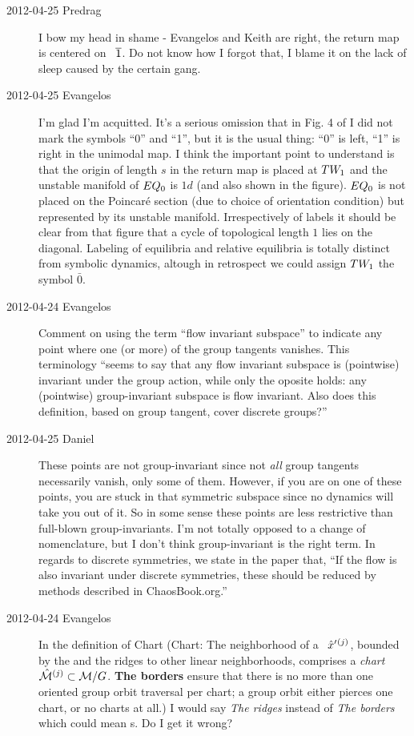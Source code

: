 \begin{description}
\item[2012-04-25 Predrag] I bow my head in shame - Evangelos and Keith
are right, the return map is centered on \rpo\ $\overline{1}$. Do not know
how I forgot that, I blame it on the lack of  sleep caused by the certain
gang.

\item[2012-04-25 Evangelos] I'm glad I'm acquitted. It's a serious omission that in Fig. 4
of  I did not mark the symbols ``0'' and ``1'', but it is the
usual thing: ``0'' is left, ``1'' is right in the unimodal map.
I think the important point to
understand is that the origin of length $s$ in the return map is placed at $TW_{1}$
and the unstable manifold of $EQ_{0}$ is $1d$ (and also shown in the figure).
$EQ_{0}$ is not placed on the Poincar\'e section (due to choice of orientation
condition) but represented by its unstable manifold.
Irrespectively of labels it should be clear from that figure that a
cycle of topological length $1$ lies on the diagonal. Labeling of equilibria
and relative equilibria is totally distinct from symbolic dynamics, altough in
retrospect we could assign $TW_{1}$ the symbol $\bar{0}$.

\item[2012-04-24 Evangelos] Comment on using the term ``flow invariant subspace'' to indicate any point where one (or more) of the group tangents vanishes. This terminology ``seems to say that any flow invariant subspace is (pointwise) invariant under the group action, while only the oposite holds: any (pointwise) group-invariant subspace is flow invariant. Also does this definition, based on group tangent, cover discrete groups?''

\item[2012-04-25 Daniel] These points are not group-invariant since not \emph{all} group tangents necessarily vanish, only some of them. However, if you are on one of these points, you are stuck in that symmetric subspace since no dynamics will take you out of it. So in some sense these points are less restrictive than full-blown group-invariants. I'm not totally opposed to a change of nomenclature, but I don't think group-invariant is the right term.
In regards to discrete symmetries, we state in the paper that, ``If the flow is also invariant under discrete symmetries, these should be reduced by methods described in ChaosBook.org.''

\item[2012-04-24 Evangelos] In the definition of Chart (Chart: The neighborhood of a \template\ ${\hat{x}'}{}^{(j)}$, bounded by the {\chartBord} and the ridges to other linear neighborhoods, comprises a \emph{chart} $\hat{\cal M}{}^{(j)} \subset {\cal M}/G$. {\bf The
borders} ensure that there is no more than one oriented group orbit traversal per chart; a group orbit either pierces one chart, or no charts at all.) I would say \emph{The ridges} instead of \emph{The borders} which could mean \ChartBord s. Do I get it wrong?


\end{description}
